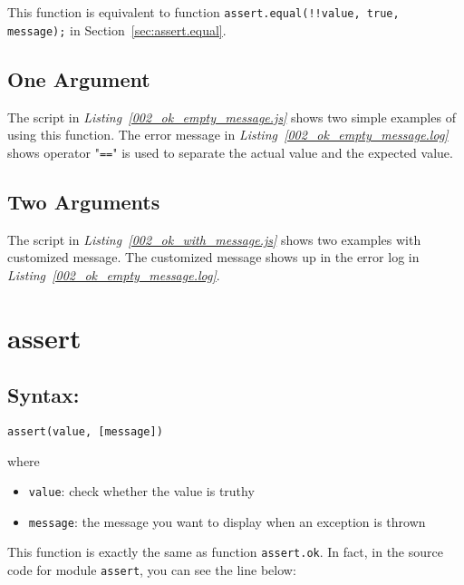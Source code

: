This function is equivalent to function \texttt{assert.equal(!!value, true, message);} in Section~\ref{sec:assert.equal}.
\subsection{One Argument}
The script in \textit{Listing~\ref{002_ok_empty_message.js}} shows two simple examples of using this function. The error message in \textit{Listing~\ref{002_ok_empty_message.log}} shows operator "\texttt{==}" is used to separate the actual value and the expected value.


\subsection{Two Arguments}
The script in \textit{Listing~\ref{002_ok_with_message.js}} shows two examples with customized message. The customized message shows up in the error log in \textit{Listing~\ref{002_ok_empty_message.log}}.


\section{assert}
\subsection*{Syntax:}
\begin{center}\texttt{assert(value, [message])}

\end{center}where
\begin{itemize}
\item \texttt{value}: check whether the value is truthy
\item \texttt{message}: the message you want to display when an exception is thrown
\end{itemize}

This function is exactly the same as function \texttt{assert.ok}. In fact, in the source code for module \texttt{assert}, you can see the line below:

